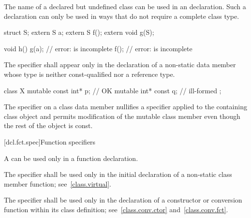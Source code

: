 \pnum
{}%
The name of a declared but undefined class can be used in an
 declaration. Such a declaration can only be used in ways
that do not require a complete class type.
\begin{example}
\begin{codeblock}
struct S;
extern S a;
extern S f();
extern void g(S);

void h() {
  g(a);                         // error:  is incomplete
  f();                          // error:  is incomplete
}
\end{codeblock}
\end{example}

\pnum
The  specifier shall appear only in the declaration of
a non-static data member
whose type is neither const-qualified nor a reference type.
\begin{example}
\begin{codeblock}
class X {
  mutable const int* p;         // OK
  mutable int* const q;         // ill-formed
};
\end{codeblock}
\end{example}

\pnum
The  specifier on a class data member nullifies a
 specifier applied to the containing class object and
permits modification of the mutable class member even though the rest of
the object is const.

[dcl.fct.spec]{Function specifiers}%
%

\pnum
A
can be used only in a function declaration.

\begin{bnf}
\br
    \br
\end{bnf}

\pnum
{}%
The  specifier shall be used only in the initial
declaration of a non-static class member function;
see~\ref{class.virtual}.

\pnum
{}%
The  specifier shall be used only in the declaration of
a constructor or conversion function within its class definition;
see~\ref{class.conv.ctor} and~\ref{class.conv.fct}.

